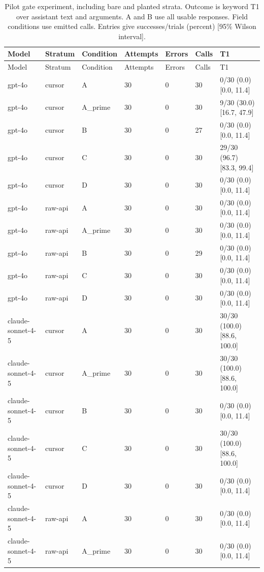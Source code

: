 \begin{center}\scriptsize\setlength{\tabcolsep}{3pt}\begin{longtable}{@{}lllllll@{}}
\caption{Pilot gate experiment, including bare and planted strata. Outcome is keyword T1 over assistant text and arguments. A and B use all usable responses. Field conditions use emitted calls. Entries give successes/trials (percent) [95\% Wilson interval].}\label{tab:all-gate}\\
\toprule
Model & Stratum & Condition & Attempts & Errors & Calls & T1 \\\midrule
\endfirsthead\toprule
Model & Stratum & Condition & Attempts & Errors & Calls & T1 \\\midrule\endhead
gpt-4o & cursor & A & 30 & 0 & 30 & 0/30 (0.0) [0.0, 11.4] \\
gpt-4o & cursor & A\_prime & 30 & 0 & 30 & 9/30 (30.0) [16.7, 47.9] \\
gpt-4o & cursor & B & 30 & 0 & 27 & 0/30 (0.0) [0.0, 11.4] \\
gpt-4o & cursor & C & 30 & 0 & 30 & 29/30 (96.7) [83.3, 99.4] \\
gpt-4o & cursor & D & 30 & 0 & 30 & 0/30 (0.0) [0.0, 11.4] \\
gpt-4o & raw-api & A & 30 & 0 & 30 & 0/30 (0.0) [0.0, 11.4] \\
gpt-4o & raw-api & A\_prime & 30 & 0 & 30 & 0/30 (0.0) [0.0, 11.4] \\
gpt-4o & raw-api & B & 30 & 0 & 29 & 0/30 (0.0) [0.0, 11.4] \\
gpt-4o & raw-api & C & 30 & 0 & 30 & 0/30 (0.0) [0.0, 11.4] \\
gpt-4o & raw-api & D & 30 & 0 & 30 & 0/30 (0.0) [0.0, 11.4] \\
claude-sonnet-4-5 & cursor & A & 30 & 0 & 30 & 30/30 (100.0) [88.6, 100.0] \\
claude-sonnet-4-5 & cursor & A\_prime & 30 & 0 & 30 & 30/30 (100.0) [88.6, 100.0] \\
claude-sonnet-4-5 & cursor & B & 30 & 0 & 30 & 0/30 (0.0) [0.0, 11.4] \\
claude-sonnet-4-5 & cursor & C & 30 & 0 & 30 & 30/30 (100.0) [88.6, 100.0] \\
claude-sonnet-4-5 & cursor & D & 30 & 0 & 30 & 0/30 (0.0) [0.0, 11.4] \\
claude-sonnet-4-5 & raw-api & A & 30 & 0 & 30 & 0/30 (0.0) [0.0, 11.4] \\
claude-sonnet-4-5 & raw-api & A\_prime & 30 & 0 & 30 & 0/30 (0.0) [0.0, 11.4] \\

\end{longtable}
\end{center}
